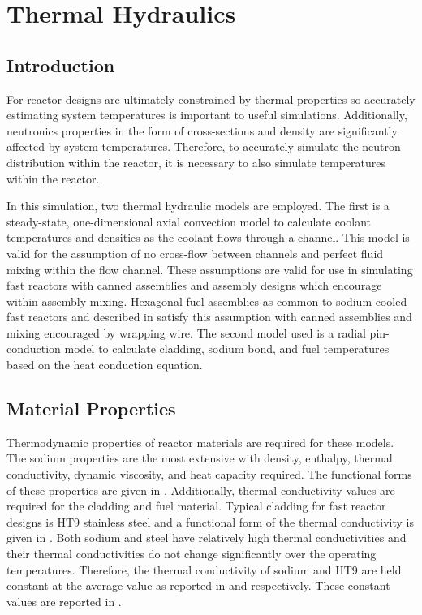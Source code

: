 \chapter{Thermal Hydraulics}
\label{ch:thermalHydraulics}

\section{Introduction}
  For reactor designs are ultimately constrained by thermal properties so
  accurately estimating system temperatures is important to useful simulations.
  Additionally, neutronics properties in the form of cross-sections 
  and density are significantly affected by system temperatures.
  Therefore, to accurately simulate the neutron distribution within the reactor,
  it is necessary to also simulate temperatures within the reactor.

  In this simulation, two thermal hydraulic models are
  employed. The first is a steady-state, one-dimensional axial convection model
  to calculate coolant temperatures and densities as the coolant flows through
  a channel. This
  model is valid for the assumption of no cross-flow between channels and 
  perfect fluid mixing within the flow channel. These assumptions are valid for
  use in simulating fast reactors with canned assemblies and assembly designs
  which encourage within-assembly mixing. Hexagonal fuel assemblies as common to
  sodium cooled fast reactors and described in 
  satisfy this assumption with canned assemblies and mixing encouraged by
  wrapping wire. The second model used is
  a radial pin-conduction model to calculate cladding, sodium bond, and fuel 
  temperatures based on the heat conduction equation.

\section{Material Properties}
  Thermodynamic properties of reactor materials are required for these models.
  The sodium properties are the most extensive with density, enthalpy, 
  thermal conductivity, dynamic viscosity, and heat capacity required. The 
  functional forms of these properties are given in 
  \cite{sodiumProp}. Additionally, thermal conductivity values are required for 
  the cladding and fuel material. Typical cladding for fast reactor designs is 
  HT9 stainless steel and a functional form of the thermal conductivity is given
  in \cite{ht9Prop}. Both sodium and steel have relatively high thermal
  conductivities and their thermal conductivities do not change significantly
  over the operating temperatures. Therefore, the thermal conductivity of sodium
  and HT9 are held constant at the average value as reported in
  \cite{sodiumProp} and \cite{ht9Prop} respectively. These constant values are
  reported in .
    
